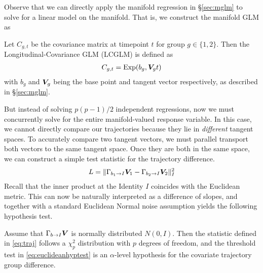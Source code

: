 Observe that we can directly apply the manifold regression in \S \ref{sec:mglm} to solve for a linear model on the manifold. 
That is, we construct the manifold GLM as
\begin{definition} Let $C_{g,t}$ be the covariance matrix at timepoint $t$ for group $g \in \{1,2\}$. Then the 
	Longitudinal-Covariance GLM (LCGLM) is defined as
	\begin{align}\label{eq:LCGLM}
		C_{g,t} = \text{Exp}(b_g, \bm{V}_g t)
	\end{align}
	with $b_g$ and $\bm{V}_g$ being the base point and tangent vector respectively, as described in \S\ref{sec:mglm}.
\label{eq:lcglm}
\end{definition}
But instead of solving $p(p-1)/2$ independent regressions, now we must concurrently solve for the entire manifold-valued response variable.
In this case, we cannot directly compare our trajectories because they lie in {\em different} tangent spaces. To accurately compare two tangent vectors, 
we must parallel transport both vectors to the same tangent space. Once they are both in the same space, we can construct a simple test statistic for the trajectory difference.
\begin{align}
L = \|\Gamma_{b_1 \rightarrow I} \bm{V}_1 - \Gamma_{b_2 \rightarrow I} \bm{V}_2 \|_{I}^2
\label{eq:traj}
\end{align}
Recall that the inner product at the Identity $I$ coincides with the Euclidean metric. This can now be naturally interpreted as a difference of slopes, and together with a standard Euclidean Normal noise assumption yields the following hypothesis test.
\begin{proposition}\label{prop_prodstat}
Assume that $\Gamma_{b \rightarrow I} \bm{V}$ is normally distributed $N(0,I)$. Then the statistic defined in \eqref{eq:traj} follows a $\chi^2_{p}$ distribution with $p$ degrees of freedom, and the threshold test in \eqref{eq:euclideanhyptest} is an $\alpha$-level hypothesis for the covariate trajectory group difference.
\end{proposition}

